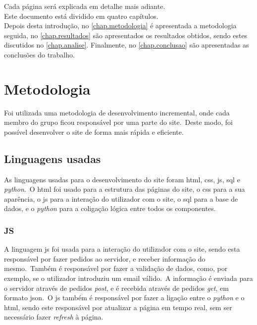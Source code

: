 \documentclass{report}
\begin{document}
Cada página será explicada em detalhe mais adiante.\\

Este documento está dividido em quatro capítulos.\\

Depois desta introdução,
no \autoref{chap.metodologia} é apresentada a metodologia seguida,
no \autoref{chap.resultados} são apresentados os resultados obtidos,
sendo estes discutidos no \autoref{chap.analise}.
Finalmente, no \autoref{chap.conclusao} são apresentadas
as conclusões do trabalho.

\chapter{Metodologia}
\label{chap.metodologia}
    Foi utilizada uma metodologia de desenvolvimento incremental, onde cada membro do grupo ficou responsável por uma parte do site.\ Deste modo, foi possível desenvolver o site de forma mais rápida e eficiente.\\

\section{Linguagens usadas}\label{sec:linguagens-usadas}
    As linguagens usadas para o desenvolvimento do site foram \ac{html}, \ac{css}, \ac{js}, \ac{sql} e \textit{python}.\ O \ac{html} foi usado para a estrutura das páginas do site, o \ac{css} para a sua aparência, o \ac{js} para a interação do utilizador com o site, o \ac{sql} para a base de dados, e o \textit{python} para a coligação lógica entre todos os componentes.\\

\subsection{JS}\label{subsec:js}
    A linguagem \ac{js} foi usada para a interação do utilizador com o site, sendo esta responsável por fazer pedidos ao servidor, e receber informação do mesmo.\ Também é responsável por fazer a validação de dados, como, por exemplo, se o utilizador introduziu um email válido.\ A informação é enviada para o servidor através de pedidos \textit{post}, e é recebida através de pedidos \textit{get}, em formato \ac{json}.\ O \ac{js} também é responsável por fazer a ligação entre o \textit{python} e o \ac{html}, sendo este responsável por atualizar a página em tempo real, sem ser necessário fazer \textit{refresh} à página.\\
\end{document}

